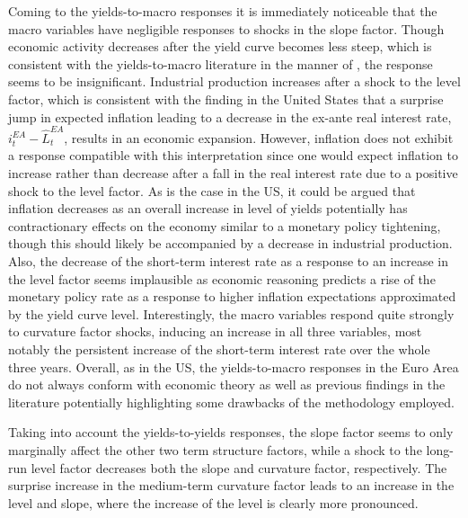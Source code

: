 Coming to the yields-to-macro responses it is immediately noticeable that the macro variables have negligible responses to shocks in the slope factor. Though economic activity decreases after the yield curve becomes less steep, which is consistent with the yields-to-macro literature in the manner of \citet{estrella1991term}, the response seems to be insignificant. 
Industrial production increases after a shock to the level factor, which is consistent with the finding in the United States that a surprise jump in expected inflation leading to a decrease in the ex-ante real interest rate, $i^{EA}_{t} - \hat{L}^{EA}_{t}$, results in an economic expansion. 
However, inflation does not exhibit a response compatible with this interpretation 
since one would expect inflation to increase rather than decrease after a fall in the real interest rate due to a positive shock to the level factor.
As is the case in the US, it could be argued that inflation decreases as an overall increase in level of yields potentially has contractionary effects on the economy similar to a monetary policy tightening, though this should likely be accompanied by a decrease in industrial production. 
Also, the decrease of the short-term interest rate as a response to an increase in the level factor seems implausible as economic reasoning predicts a rise of the monetary policy rate as a response to higher inflation expectations approximated by the yield curve level. 
Interestingly, the macro variables respond quite strongly to curvature factor shocks, inducing an increase in all three variables, most notably the persistent increase of the short-term interest rate over the whole three years.
Overall, as in the US, the yields-to-macro responses in the Euro Area do not always conform with economic theory as well as previous findings in the literature potentially highlighting some drawbacks of the methodology employed. 

Taking into account the yields-to-yields responses, the slope factor seems to only marginally affect the other two term structure factors, while a shock to the long-run level factor decreases both the slope and curvature factor, respectively.
The surprise increase in the medium-term curvature factor leads to an increase in the level and slope, where the increase of the level is clearly more pronounced.

